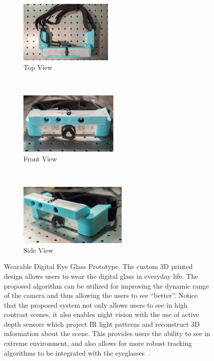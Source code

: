 \begin{figure}
\centering
\begin{subfigure}{.32\textwidth}
\centering
\includegraphics[height=1.2in]{ch4/diagrams/hdrglass/lowres/IMG_0257.jpg}
\caption{Top View}
\label{fig_third_case}
\end{subfigure}
~
\begin{subfigure}{.32\textwidth}
\centering
\includegraphics[height=1.2in]{ch4/diagrams/hdrglass/lowres/IMG_0263.jpg}
\caption{Front View}
\label{fig_second_case}
\end{subfigure}
~
\begin{subfigure}{.32\textwidth}
\centering
\includegraphics[height=1.2in]{ch4/diagrams/hdrglass/lowres/IMG_0258.jpg}
\caption{Side View}
\label{fig_first_case}
\end{subfigure}

\caption{Wearable Digital Eye Glass Prototype. The custom 3D printed design allows users to wear the digital glass in everyday life. The proposed algorithm can be utilized for improving the dynamic range of the camera and thus allowing the users to see ``better''. Notice that the proposed system not only allows users to see in high contrast scenes, it also enables night vision with the use of active depth sensors which project IR light patterns and reconstruct 3D information about the scene. This provides users the ability to see in extreme environment, and also allows for more robust tracking algorithms to be integrated with the eyeglasses~\cite{lo2013three}.}
\label{fig_wearable_glass}
\end{figure}


